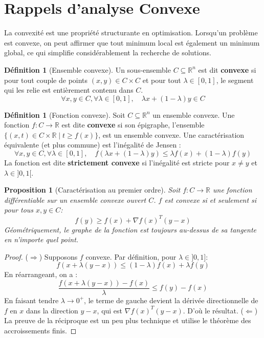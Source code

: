 \documentclass[a4paper,12pt,openany]{book}
\theoremstyle{plain}
\newtheorem{proposition}[theorem]{Proposition}
\theoremstyle{definition}
\newtheorem{definition}[theorem]{Définition}
\theoremstyle{remark}
\theoremstyle{nbstyle}
\newcommand{\R}{\mathbb{R}}
\newcommand{\grad}{\nabla}
\newcommand{\T}{^T}
\begin{document}
	\section{Rappels d'analyse Convexe}
	La convexité est une propriété structurante en optimisation. Lorsqu'un problème est convexe, on peut affirmer que tout minimum local est également un minimum global, ce qui simplifie considérablement la recherche de solutions.
	
	\begin{definition}[Ensemble convexe]
		Un sous-ensemble $C \subseteq \R^n$ est dit \textbf{convexe} si pour tout couple de points $(x, y) \in C \times C$ et pour tout $\lambda \in [0, 1]$, le segment qui les relie est entièrement contenu dans $C$.
		$$ \forall x,y \in C, \forall \lambda \in [0,1], \quad \lambda x + (1-\lambda)y \in C $$
	\end{definition}
	
	\begin{definition}[Fonction convexe]
		Soit $C \subseteq \R^n$ un ensemble convexe. Une fonction $f: C \to \R$ est dite \textbf{convexe} si son épigraphe, l'ensemble $\{(x,t) \in C \times \R \mid t \ge f(x)\}$, est un ensemble convexe.
		Une caractérisation équivalente (et plus commune) est l'inégalité de Jensen :
		$$ \forall x,y \in C, \forall \lambda \in [0,1], \quad f(\lambda x + (1-\lambda)y) \le \lambda f(x) + (1-\lambda)f(y) $$
		La fonction est dite \textbf{strictement convexe} si l'inégalité est stricte pour $x \ne y$ et $\lambda \in ]0, 1[$.
	\end{definition}
	
	\begin{proposition}[Caractérisation au premier ordre]
		Soit $f: C \to \R$ une fonction différentiable sur un ensemble convexe ouvert $C$.
		$f$ est convexe si et seulement si pour tous $x, y \in C$:
		$$ f(y) \ge f(x) + \grad f(x)\T (y-x) $$
		Géométriquement, le graphe de la fonction est toujours au-dessus de sa tangente en n'importe quel point.
	\end{proposition}
	
	\begin{proof}
		($\Rightarrow$) Supposons $f$ convexe. Par définition, pour $\lambda \in ]0,1]$:
		$$ f(x + \lambda(y-x)) \le (1-\lambda)f(x) + \lambda f(y) $$
		En réarrangeant, on a :
		$$ \frac{f(x + \lambda(y-x)) - f(x)}{\lambda} \le f(y) - f(x) $$
		En faisant tendre $\lambda \to 0^+$, le terme de gauche devient la dérivée directionnelle de $f$ en $x$ dans la direction $y-x$, qui est $\grad f(x)\T(y-x)$. D'où le résultat.
		($\Leftarrow$) La preuve de la réciproque est un peu plus technique et utilise le théorème des accroissements finis.
	\end{proof}
	
\end{document}
